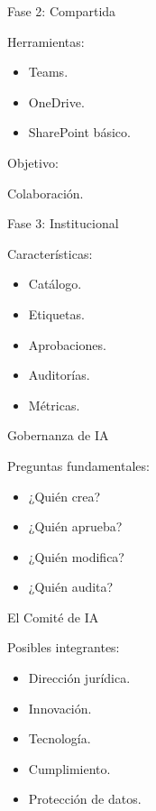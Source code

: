 \documentclass[aspectratio=169]{beamer}
\begin{document}
\begin{frame}{Fase 2: Compartida}


Herramientas:

\begin{itemize}
  \item Teams.
  \item OneDrive.
  \item SharePoint básico.
\end{itemize}
Objetivo:

Colaboración.

\end{frame}

\begin{frame}{Fase 3: Institucional}


Características:

\begin{itemize}
  \item Catálogo.
  \item Etiquetas.
  \item Aprobaciones.
  \item Auditorías.
  \item Métricas.
\end{itemize}
\end{frame}

\begin{frame}{Gobernanza de IA}


Preguntas fundamentales:

\begin{itemize}
  \item ¿Quién crea?
  \item ¿Quién aprueba?
  \item ¿Quién modifica?
  \item ¿Quién audita?
\end{itemize}
\end{frame}

\begin{frame}{El Comité de IA}


Posibles integrantes:

\begin{itemize}
  \item Dirección jurídica.
  \item Innovación.
  \item Tecnología.
  \item Cumplimiento.
  \item Protección de datos.
\end{itemize}
\end{frame}
\end{document}
